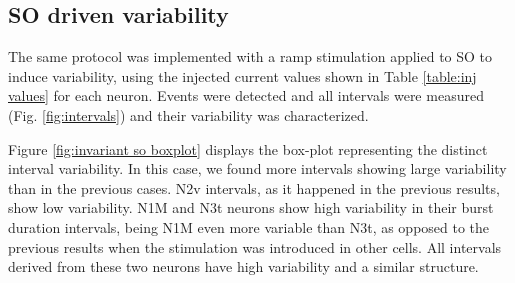 \subsection{SO driven variability}

The same protocol was implemented with a ramp stimulation applied to SO to induce variability, using the injected current values shown in Table \ref{table:inj values} for each neuron. Events were detected and all intervals were measured (Fig. \ref{fig:intervals}) and their variability was characterized. %

Figure \ref{fig:invariant so boxplot} displays the box-plot representing the distinct interval variability. In this case, we found more intervals showing large variability than in the previous cases. N2v intervals, as it happened in the previous results, show low variability. %
N1M and N3t neurons show high variability in their burst duration intervals, being N1M even more variable than N3t, as opposed to the previous results when the stimulation was introduced in other cells. All intervals derived from these two neurons have high variability and a similar structure. %




